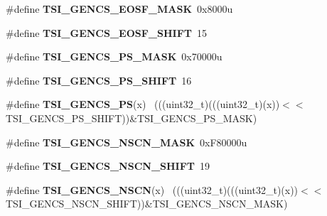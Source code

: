 \begin{DoxyCompactItemize}
\item 
\hypertarget{group___t_s_i___register___masks_ga820de7fe1ecba9a42260e304554b389f}{}\#define {\bfseries T\+S\+I\+\_\+\+G\+E\+N\+C\+S\+\_\+\+E\+O\+S\+F\+\_\+\+M\+A\+S\+K}~0x8000u\label{group___t_s_i___register___masks_ga820de7fe1ecba9a42260e304554b389f}

\item 
\hypertarget{group___t_s_i___register___masks_ga9a2e8c68bfb60312ebdeea4f069d9086}{}\#define {\bfseries T\+S\+I\+\_\+\+G\+E\+N\+C\+S\+\_\+\+E\+O\+S\+F\+\_\+\+S\+H\+I\+F\+T}~15\label{group___t_s_i___register___masks_ga9a2e8c68bfb60312ebdeea4f069d9086}

\item 
\hypertarget{group___t_s_i___register___masks_ga3c608c250c31872d206e9c18eea97799}{}\#define {\bfseries T\+S\+I\+\_\+\+G\+E\+N\+C\+S\+\_\+\+P\+S\+\_\+\+M\+A\+S\+K}~0x70000u\label{group___t_s_i___register___masks_ga3c608c250c31872d206e9c18eea97799}

\item 
\hypertarget{group___t_s_i___register___masks_gaae1f3b081a9c92fefe10bd3ec1f40734}{}\#define {\bfseries T\+S\+I\+\_\+\+G\+E\+N\+C\+S\+\_\+\+P\+S\+\_\+\+S\+H\+I\+F\+T}~16\label{group___t_s_i___register___masks_gaae1f3b081a9c92fefe10bd3ec1f40734}

\item 
\hypertarget{group___t_s_i___register___masks_ga6edb5dbc41896c6d33fd1395d9e1a17d}{}\#define {\bfseries T\+S\+I\+\_\+\+G\+E\+N\+C\+S\+\_\+\+P\+S}(x)                                                ~(((uint32\+\_\+t)(((uint32\+\_\+t)(x))$<$$<$T\+S\+I\+\_\+\+G\+E\+N\+C\+S\+\_\+\+P\+S\+\_\+\+S\+H\+I\+F\+T))\&T\+S\+I\+\_\+\+G\+E\+N\+C\+S\+\_\+\+P\+S\+\_\+\+M\+A\+S\+K)\label{group___t_s_i___register___masks_ga6edb5dbc41896c6d33fd1395d9e1a17d}

\item 
\hypertarget{group___t_s_i___register___masks_ga3a420e0ae200374eca1a185b535cc0ba}{}\#define {\bfseries T\+S\+I\+\_\+\+G\+E\+N\+C\+S\+\_\+\+N\+S\+C\+N\+\_\+\+M\+A\+S\+K}~0x\+F80000u\label{group___t_s_i___register___masks_ga3a420e0ae200374eca1a185b535cc0ba}

\item 
\hypertarget{group___t_s_i___register___masks_gab90732bc69449d59a0fc0f3c208caf21}{}\#define {\bfseries T\+S\+I\+\_\+\+G\+E\+N\+C\+S\+\_\+\+N\+S\+C\+N\+\_\+\+S\+H\+I\+F\+T}~19\label{group___t_s_i___register___masks_gab90732bc69449d59a0fc0f3c208caf21}

\item 
\hypertarget{group___t_s_i___register___masks_ga88b69a519adf7824cdb68192fb98b684}{}\#define {\bfseries T\+S\+I\+\_\+\+G\+E\+N\+C\+S\+\_\+\+N\+S\+C\+N}(x)                                            ~(((uint32\+\_\+t)(((uint32\+\_\+t)(x))$<$$<$T\+S\+I\+\_\+\+G\+E\+N\+C\+S\+\_\+\+N\+S\+C\+N\+\_\+\+S\+H\+I\+F\+T))\&T\+S\+I\+\_\+\+G\+E\+N\+C\+S\+\_\+\+N\+S\+C\+N\+\_\+\+M\+A\+S\+K)\label{group___t_s_i___register___masks_ga88b69a519adf7824cdb68192fb98b684}


\end{DoxyCompactItemize}
